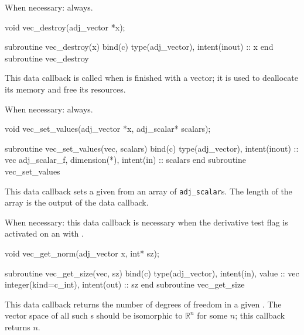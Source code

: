 When necessary: always.
\begin{framed}
\begin{minipage}{\columnwidth}
\begin{ccode}
  void vec_destroy(adj_vector *x);
\end{ccode}
\begin{fortrancode}
  subroutine vec_destroy(x) bind(c)
    type(adj_vector), intent(inout) :: x
  end subroutine vec_destroy
\end{fortrancode}
\end{minipage}
\end{framed}
This data callback is called when \libadjoint is finished
with a vector; it is used to deallocate its memory and free
its resources.

When necessary: always.
\begin{framed}
\begin{minipage}{\columnwidth}
\begin{ccode}
  void vec_set_values(adj_vector *x, adj_scalar* scalars);
\end{ccode}
\begin{fortrancode}
  subroutine vec_set_values(vec, scalars) bind(c)
    type(adj_vector), intent(inout) :: vec
    adj_scalar_f, dimension(*), intent(in) :: scalars
  end subroutine vec_set_values
\end{fortrancode}
\end{minipage}
\end{framed}
This data callback sets a given  from an array
of \texttt{adj_scalar}s. The length of the array is the output of
the  data callback.

When necessary: this data callback is necessary when the derivative test flag
is activated on an  with .
\begin{framed}
\begin{minipage}{\columnwidth}
\begin{ccode}
  void vec_get_norm(adj_vector x, int* sz);
\end{ccode}
\begin{fortrancode}
  subroutine vec_get_size(vec, sz) bind(c)
    type(adj_vector), intent(in), value :: vec
    integer(kind=c_int), intent(out) :: sz
  end subroutine vec_get_size
\end{fortrancode}
\end{minipage}
\end{framed}
This data callback returns the number of degrees of freedom in a given . The
vector space of all such s should be isomorphic to $\mathbb{R}^n$ for some $n$;
this callback returns $n$.

